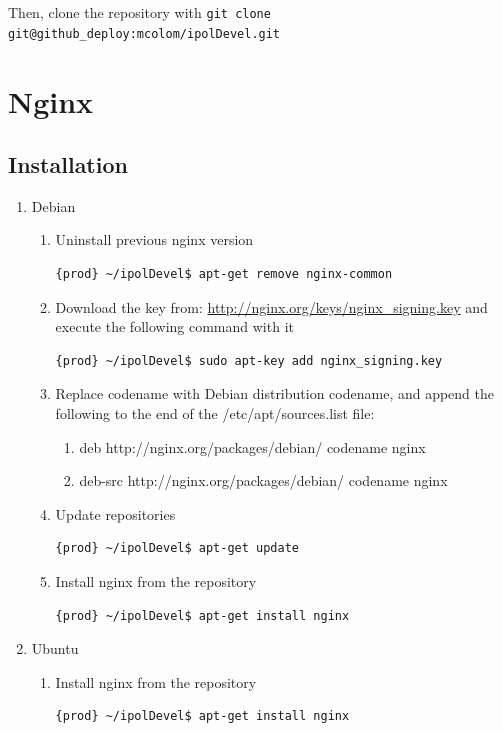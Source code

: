 \documentclass[a4paper,12pt]{article}
\begin{document}
Then, clone the repository with {\tt git clone git@github\_deploy:mcolom/ipolDevel.git}

\section{Nginx}

\subsection{Installation}

\begin{enumerate}
\item Debian

\begin{enumerate}
    \item Uninstall previous nginx version
    \begin{lstlisting}[language=Bash]
	{prod} ~/ipolDevel$ apt-get remove nginx-common
    \end{lstlisting}

    \item Download the key from: \url{http://nginx.org/keys/nginx_signing.key} and execute the following command with it
    \begin{lstlisting}[language=Bash]
	{prod} ~/ipolDevel$ sudo apt-key add nginx_signing.key
    \end{lstlisting}

    \item Replace codename with Debian distribution codename, and append the following to the end of the /etc/apt/sources.list file:
    \begin{enumerate}
	\item deb http://nginx.org/packages/debian/ codename nginx
	\item deb-src http://nginx.org/packages/debian/ codename nginx
    \end{enumerate}

    \item Update repositories
    \begin{lstlisting}[language=Bash]
    {prod} ~/ipolDevel$ apt-get update
    \end{lstlisting}

    \item Install nginx from the repository
    \begin{lstlisting}[language=Bash]
    {prod} ~/ipolDevel$ apt-get install nginx
    \end{lstlisting}
    \end{enumerate}
    
    \item Ubuntu
    \begin{enumerate}
	\item Install nginx from the repository
	\begin{lstlisting}[language=Bash]
	{prod} ~/ipolDevel$ apt-get install nginx
	\end{lstlisting}
    \end{enumerate}    
\end{enumerate}
\end{document}
